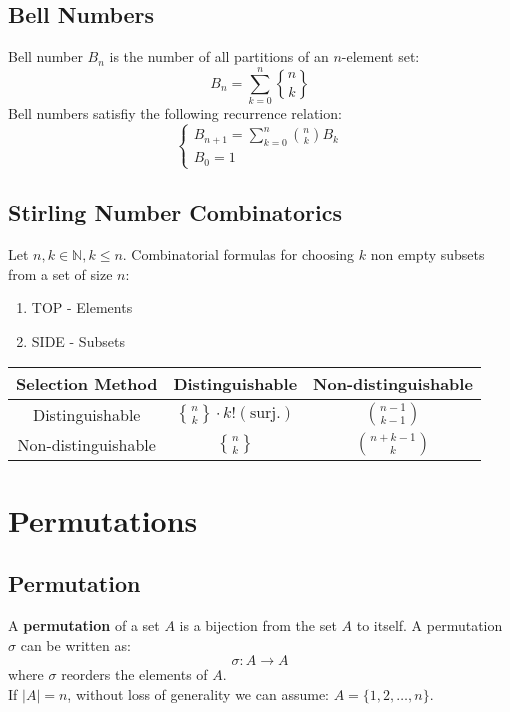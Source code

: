 \documentclass{article}
\newenvironment{information}[1]{%
    \trivlist
    \item[\hskip\labelsep\textbf{Information. #1.}]
    \ignorespaces
}{%
    \endtrivlist
}
\begin{document}
\subsection{Bell Numbers}

Bell number $B_n$ is the number of all partitions of an $n$-element set:
\[
B_n = \sum_{k=0}^{n} \genfrac\{\}{0pt}{0}{n}{k}
\]
Bell numbers satisfiy the following recurrence relation:
\[
\begin{cases}
B_{n+1} = \sum_{k=0}^{n} \binom{n}{k} B_k\\
B_0 = 1
\end{cases}
\]

\subsection{Stirling Number Combinatorics}

\begin{information}{Choosing $k$ elements from $n$}
    Let $n, k \in\mathbb{N}, k\leq n$. Combinatorial formulas for choosing \( k \) non empty subsets from a set of size \( n \):
    \begin{enumerate}
        \item TOP - Elements
        \item SIDE - Subsets
    \end{enumerate}
    \begin{table}[htbp]
        \centering
        \bgroup
        \def\arraystretch{1.5}%
        \begin{tabular}{|c|c|c|}
            \hline
            \textbf{Selection Method} & \textbf{Distinguishable} & \textbf{Non-distinguishable} \\
            \hline
            Distinguishable & \( \genfrac\{\}{0pt}{1}{n}{k}\cdot k! (\text{surj.}) \) & \( \binom{n-1}{k-1} \) \\
            \hline
            Non-distinguishable & \( \genfrac\{\}{0pt}{1}{n}{k} \) & \( \binom{n+k-1}{k} \) \\
            \hline
        \end{tabular}
        \egroup
    \end{table}
\end{information}

\section{Permutations}

\subsection{Permutation}
A \textbf{permutation} of a set \(A\) is a bijection from the set \(A\) to itself. A permutation \(\sigma\) can be written as:
\[\sigma : A \to A\]
where \(\sigma\) reorders the elements of \(A\).\\
If \(|A|=n\), without loss of generality we can assume: \(A = \{1, 2, \ldots, n\}\).
\end{document}

